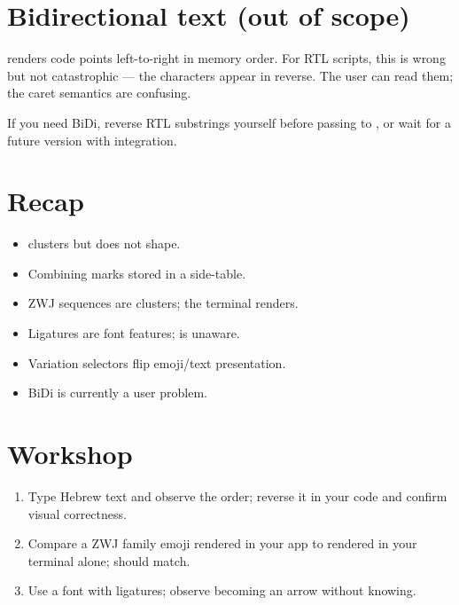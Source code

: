\section{Bidirectional text (out of scope)}

\maya{} renders code points left-to-right in memory order.
For RTL scripts, this is wrong but not catastrophic --- the
characters appear in reverse. The user can read them; the
caret semantics are confusing.

If you need BiDi, reverse RTL substrings yourself before
passing to \maya{}, or wait for a future version with
 integration.

\section{Recap}

\begin{recap}
\begin{itemize}[leftmargin=*]
  \item \maya{} clusters but does not shape.
  \item Combining marks stored in a side-table.
  \item ZWJ sequences are clusters; the terminal renders.
  \item Ligatures are font features; \maya{} is unaware.
  \item Variation selectors flip emoji/text presentation.
  \item BiDi is currently a user problem.
\end{itemize}
\end{recap}

\section*{Workshop}

\begin{enumerate}[leftmargin=*]
  \item Type Hebrew text and observe the order; reverse it
    in your code and confirm visual correctness.
  \item Compare a ZWJ family emoji rendered in your app to
    rendered in your terminal alone; should match.
  \item Use a font with ligatures; observe \code{->}
    becoming an arrow without \maya{} knowing.
\end{enumerate}
